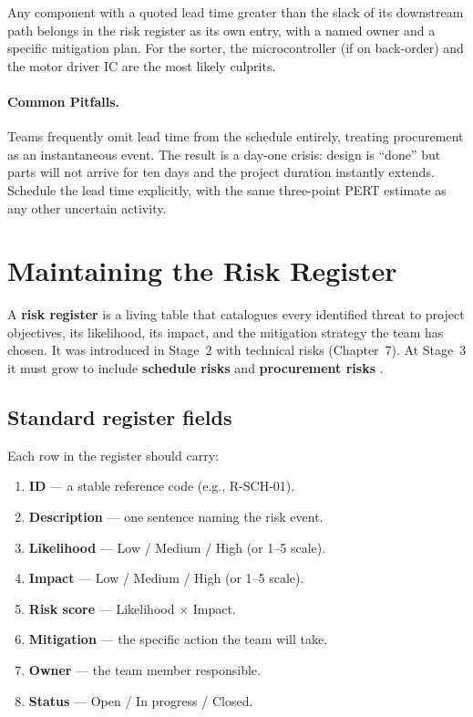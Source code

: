 Any component with a quoted lead time greater than the slack of its
downstream path belongs in the risk register as its own entry, with a named owner and a specific mitigation plan.
For the sorter, the microcontroller (if on back-order) and the motor
driver IC are the most likely culprits.

\paragraph{Common Pitfalls.}
Teams frequently omit lead time from the schedule entirely, treating
procurement as an instantaneous event.
The result is a day-one crisis: design is ``done'' but parts will not
arrive for ten days and the project duration instantly extends.
Schedule the lead time explicitly, with the same three-point PERT
estimate as any other uncertain activity.

\section{Maintaining the Risk Register}
\label{sec:risk}

A \textbf{risk register} is a living table that
catalogues every identified threat to project objectives, its
likelihood, its impact, and the mitigation strategy the team has
chosen.
It was introduced in Stage~2 with technical risks (Chapter~7).
At Stage~3 it must grow to include \textbf{schedule risks}
 and \textbf{procurement risks}
.

\subsection{Standard register fields}

Each row in the register should carry:
\begin{enumerate}
  \item \textbf{ID} — a stable reference code (e.g., R-SCH-01).
  \item \textbf{Description} — one sentence naming the risk event.
  \item \textbf{Likelihood} — Low / Medium / High (or 1–5 scale).
  \item \textbf{Impact} — Low / Medium / High (or 1–5 scale).
  \item \textbf{Risk score} — Likelihood $\times$ Impact.
  \item \textbf{Mitigation} — the specific action the team will take.
  \item \textbf{Owner} — the team member responsible.
  \item \textbf{Status} — Open / In progress / Closed.
\end{enumerate}

